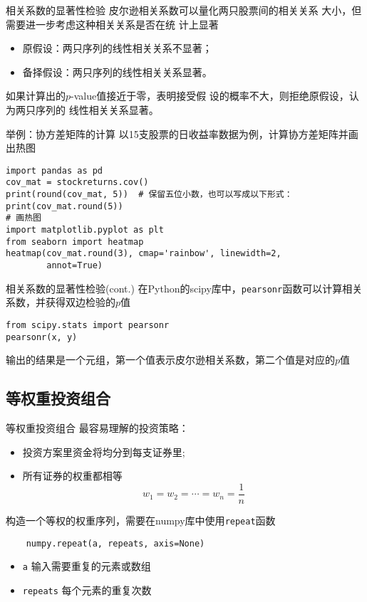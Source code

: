 \documentclass[t]{beamer}
\begin{document}
\begin{frame}[fragile]{相关系数的显著性检验}
    皮尔逊相关系数可以量化两只股票间的相关关系
    大小，但需要进一步考虑这种相关关系是否在统
    计上显著
\begin{itemize}
    \item 原假设：两只序列的线性相关关系不显著；
    \item 备择假设：两只序列的线性相关关系显著。
\end{itemize}
如果计算出的$p$-value值接近于零，表明接受假
设的概率不大，则拒绝原假设，认为两只序列的
线性相关关系显著。
\end{frame}


\begin{frame}[fragile]{举例：协方差矩阵的计算}
以15支股票的日收益率数据为例，计算协方差矩阵并画出热图
\begin{lstlisting}
import pandas as pd
cov_mat = stockreturns.cov()
print(round(cov_mat, 5))  # 保留五位小数，也可以写成以下形式：
print(cov_mat.round(5))
# 画热图
import matplotlib.pyplot as plt
from seaborn import heatmap
heatmap(cov_mat.round(3), cmap='rainbow', linewidth=2, 
        annot=True)
\end{lstlisting}
\end{frame}


\begin{frame}[fragile]{相关系数的显著性检验(cont.)}
在Python的scipy库中，\verb|pearsonr|函数可以计算相关系数，并获得双边检验的$p$值
\begin{lstlisting}
from scipy.stats import pearsonr
pearsonr(x, y)
\end{lstlisting}

输出的结果是一个元组，第一个值表示皮尔逊相关系数，第二个值是对应的$p$值
\end{frame}


\subsection{等权重投资组合}
\begin{frame}[fragile]{等权重投资组合}
    最容易理解的投资策略：
\begin{itemize}
    \item 投资方案里资金将均分到每支证券里;
    \item 所有证券的权重都相等
    \[w_1=w_2=\cdots=w_n=\frac{1}{n}\]
\end{itemize}    

构造一个等权的权重序列，需要在numpy库中使用\verb|repeat|函数
\begin{lstlisting}
    numpy.repeat(a, repeats, axis=None)
\end{lstlisting}
\begin{itemize}
    \item \verb|a| 输入需要重复的元素或数组
    \item \verb|repeats| 每个元素的重复次数
\end{itemize}
\end{frame}
\end{document}
